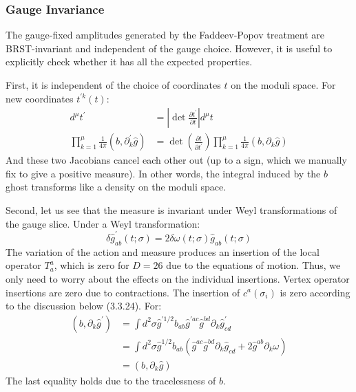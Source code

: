 \subsubsection*{\Large Gauge Invariance}
The gauge-fixed amplitudes generated by the Faddeev-Popov treatment are BRST-invariant and independent of the gauge choice. However, it is useful to explicitly check whether it has all the expected properties.

First, it is independent of the choice of coordinates $t$ on the moduli space. For new coordinates $t^{\prime k}(t)$:
\begin{equation}
	\begin{aligned}
		d^{\mu} t^{\prime} &=\left|\operatorname{det} \frac{\partial t^{\prime}}{\partial t}\right| d^{\mu} t \\
		\prod_{k=1}^{\mu} \frac{1}{4 \pi}\left(b, \partial_{k}^{\prime} \hat{g}\right) &=\operatorname{det}\left(\frac{\partial t}{\partial t^{\prime}}\right) \prod_{k=1}^{\mu} \frac{1}{4 \pi}\left(b, \partial_{k} \hat{g}\right)
	\end{aligned}
\end{equation}
And these two Jacobians cancel each other out (up to a sign, which we manually fix to give a positive measure). In other words, the integral induced by the $b$ ghost transforms like a density on the moduli space.

Second, let us see that the measure is invariant under Weyl transformations of the gauge slice. Under a Weyl transformation:
\begin{equation}
	\delta \hat{g}_{a b}^{\prime}(t ; \sigma)=2 \delta \omega(t ; \sigma) \hat{g}_{a b}(t ; \sigma)
\end{equation}
The variation of the action and measure produces an insertion of the local operator $T_a^a$, which is zero for $D=26$ due to the equations of motion. Thus, we only need to worry about the effects on the individual insertions. Vertex operator insertions are zero due to contractions. The insertion of $c^a(\sigma_i)$ is zero according to the discussion below (3.3.24). For:
\begin{equation}
	\begin{aligned}
		\left(b, \partial_{k} \hat{g}^{\prime}\right) &=\int d^{2} \sigma \hat{g}^{\prime 1 / 2} b_{a b} \hat{g}^{\prime a c} \hat{g}^{b d} \partial_{k} \hat{g}_{c d}^{\prime} \\
		&=\int d^{2} \sigma \hat{g}^{1 / 2} b_{a b}\left(\hat{g}^{a c} \hat{g}^{b d} \partial_{k} \hat{g}_{c d}+2 \hat{g}^{a b} \partial_{k} \omega\right) \\
		&=\left(b, \partial_{k} \hat{g}\right)
	\end{aligned}
\end{equation}
The last equality holds due to the tracelessness of $b$.

